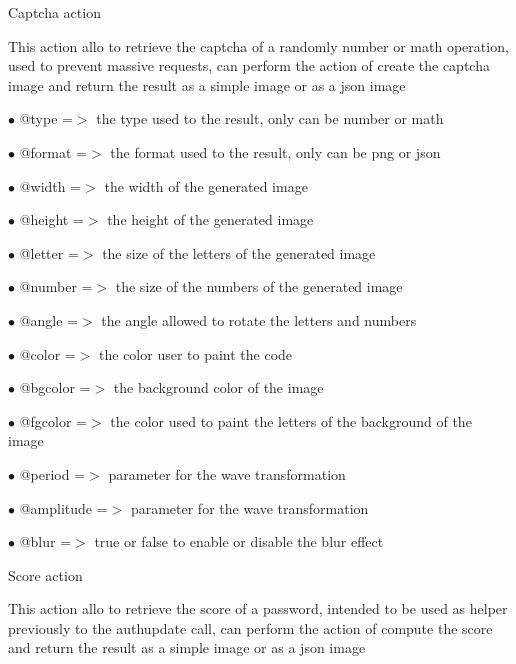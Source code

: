 \documentclass[a4paper]{article}
\begin{document}
Captcha action

This action allo to retrieve the captcha of a randomly number or math
operation, used to prevent massive requests, can perform the action of
create the captcha image and return the result as a simple image or as
a json image

\begin{compactitem}
\item[\color{myblue}$\bullet$] @type   =$>$ the type used to the result, only can be number or math
\item[\color{myblue}$\bullet$] @format =$>$ the format used to the result, only can be png or json
\end{compactitem}

\begin{compactitem}
\item[\color{myblue}$\bullet$] @width     =$>$ the width of the generated image
\item[\color{myblue}$\bullet$] @height    =$>$ the height of the generated image
\item[\color{myblue}$\bullet$] @letter    =$>$ the size of the letters of the generated image
\item[\color{myblue}$\bullet$] @number    =$>$ the size of the numbers of the generated image
\item[\color{myblue}$\bullet$] @angle     =$>$ the angle allowed to rotate the letters and numbers
\item[\color{myblue}$\bullet$] @color     =$>$ the color user to paint the code
\item[\color{myblue}$\bullet$] @bgcolor   =$>$ the background color of the image
\item[\color{myblue}$\bullet$] @fgcolor   =$>$ the color used to paint the letters of the background of the image
\item[\color{myblue}$\bullet$] @period    =$>$ parameter for the wave transformation
\item[\color{myblue}$\bullet$] @amplitude =$>$ parameter for the wave transformation
\item[\color{myblue}$\bullet$] @blur      =$>$ true or false to enable or disable the blur effect
\end{compactitem}

Score action

This action allo to retrieve the score of a password, intended to be used
as helper previously to the authupdate call, can perform the action of
compute the score and return the result as a simple image or as a json
image
\end{document}
